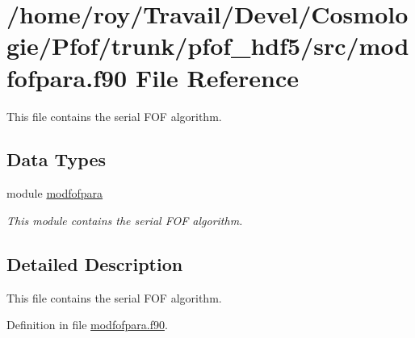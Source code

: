 \hypertarget{pfof__hdf5_2src_2modfofpara_8f90}{\section{/home/roy/\-Travail/\-Devel/\-Cosmologie/\-Pfof/trunk/pfof\-\_\-hdf5/src/modfofpara.f90 File Reference}
\label{pfof__hdf5_2src_2modfofpara_8f90}
}


This file contains the serial F\-O\-F algorithm.  


\subsection*{Data Types}
\begin{DoxyCompactItemize}
\item 
module \hyperlink{classmodfofpara}{modfofpara}
\begin{DoxyCompactList}\small\item\em This module contains the serial F\-O\-F algorithm. \end{DoxyCompactList}\end{DoxyCompactItemize}


\subsection{Detailed Description}
This file contains the serial F\-O\-F algorithm. 

Definition in file \hyperlink{pfof__hdf5_2src_2modfofpara_8f90_source}{modfofpara.\-f90}.

